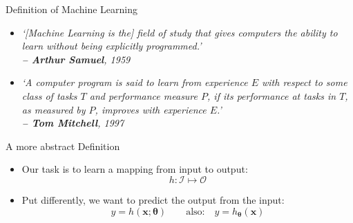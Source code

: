 \begin{frame}{Definition of Machine Learning}{}
	\begin{itemize}
		\item \textit{`[Machine Learning is the] field of study that gives computers the ability
			to learn without being explicitly programmed.' \\
			\hfill\textbf{-- Arthur Samuel}, 1959}
		\vspace*{5mm}
		\item \textit{`A computer program is said to learn from experience $E$ with respect to some class of 
			tasks $T$ and performance measure $P$, if its performance at tasks in $T$, as measured by $P$, improves with
			experience $E$.' \\
			\hfill\textbf{-- Tom Mitchell}, 1997}
	\end{itemize}
\end{frame}


\begin{frame}{A more abstract Definition}{}\important
	\begin{itemize}
		\item Our task is to learn a mapping from input to output:
		\begin{equation*}
			h : \mathcal{I} \mapsto \mathcal{O}
		\end{equation*}
		\item Put differently, we want to predict the output from the input:
		\begin{equation*}
			y = h(\bm{x}; \bm{\theta}) \qquad\text{also:}\quad y = h_{\bm{\theta}}(\bm{x})
		\end{equation*}
	\end{itemize}
\end{frame}


